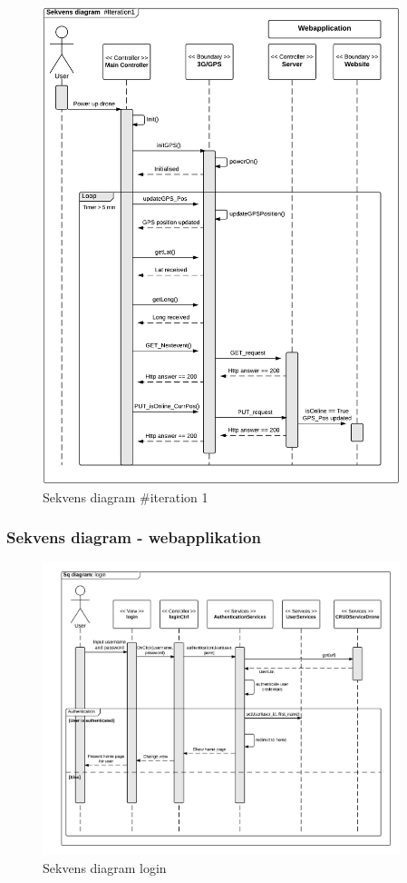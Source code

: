 \begin{figure}[H]
	\centering
	\includegraphics[width=0.93\textwidth]{Billeder/sekvens/sekvens_iteration1}
	\caption{Sekvens diagram \#iteration 1}
	\label{fig:Sekvens_diagram_iteration1}
\end{figure}
\newpage

\subsubsection*{Sekvens diagram - webapplikation}

\begin{figure}[H]
	\centering
	\includegraphics[width=0.93\textwidth]{Billeder/sekvens/login_sq_diagram.png}
	\caption{Sekvens diagram login}
	\label{fig:Sekvens_diagram_login}
\end{figure}
\newpage

